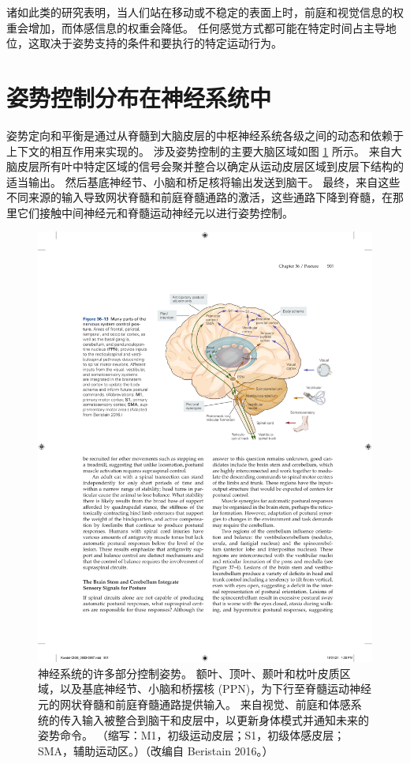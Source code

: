 诸如此类的研究表明，当人们站在移动或不稳定的表面上时，前庭和视觉信息的权重会增加，而体感信息的权重会降低。 任何感觉方式都可能在特定时间占主导地位，这取决于姿势支持的条件和要执行的特定运动行为。


\section{姿势控制分布在神经系统中}
姿势定向和平衡是通过从脊髓到大脑皮层的中枢神经系统各级之间的动态和依赖于上下文的相互作用来实现的。 
涉及姿势控制的主要大脑区域如图 \ref{fig:36_13} 所示。
来自大脑皮层所有叶中特定区域的信号会聚并整合以确定从运动皮层区域到皮层下结构的适当输出。 然后基底神经节、小脑和桥足核将输出发送到脑干。 最终，来自这些不同来源的输入导致网状脊髓和前庭脊髓通路的激活，这些通路下降到脊髓，在那里它们接触中间神经元和脊髓运动神经元以进行姿势控制。

\begin{figure}[htbp]
	\centering
	\includegraphics[width=0.75\linewidth]{chap36/fig_36_13}
	\caption{神经系统的许多部分控制姿势。 额叶、顶叶、颞叶和枕叶皮质区域，以及基底神经节、小脑和桥摆核 (PPN)，为下行至脊髓运动神经元的网状脊髓和前庭脊髓通路提供输入。 来自视觉、前庭和体感系统的传入输入被整合到脑干和皮层中，以更新身体模式并通知未来的姿势命令。 （缩写：M1，初级运动皮层；S1，初级体感皮层；SMA，辅助运动区。）（改编自 Beristain 2016。）}
	\label{fig:36_13}
\end{figure}

